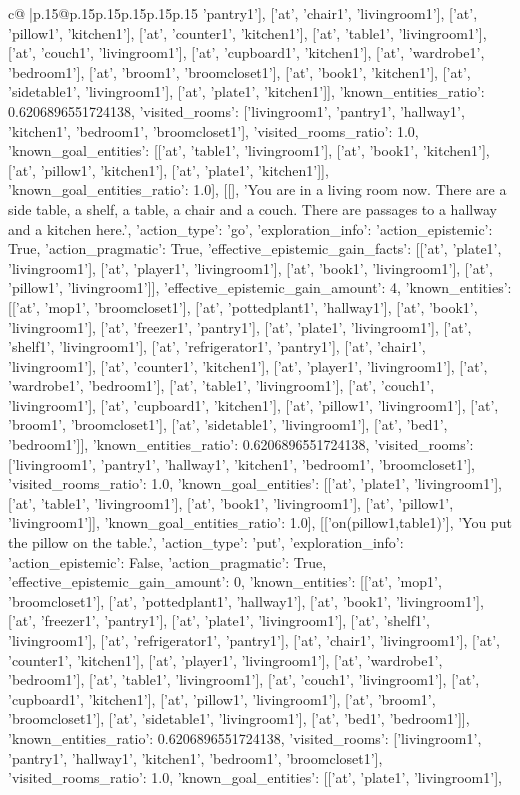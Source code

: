 \documentclass{article}
\begin{document}
{\begin{supertabular}{c@{$\;$}|p{.15\linewidth}@{}p{.15\linewidth}p{.15\linewidth}p{.15\linewidth}p{.15\linewidth}p{.15\linewidth}}
{{{'pantry1'], ['at', 'chair1', 'livingroom1'], ['at', 'pillow1', 'kitchen1'], ['at', 'counter1', 'kitchen1'], ['at', 'table1', 'livingroom1'], ['at', 'couch1', 'livingroom1'], ['at', 'cupboard1', 'kitchen1'], ['at', 'wardrobe1', 'bedroom1'], ['at', 'broom1', 'broomcloset1'], ['at', 'book1', 'kitchen1'], ['at', 'sidetable1', 'livingroom1'], ['at', 'plate1', 'kitchen1']], 'known_entities_ratio': 0.6206896551724138, 'visited_rooms': ['livingroom1', 'pantry1', 'hallway1', 'kitchen1', 'bedroom1', 'broomcloset1'], 'visited_rooms_ratio': 1.0, 'known_goal_entities': [['at', 'table1', 'livingroom1'], ['at', 'book1', 'kitchen1'], ['at', 'pillow1', 'kitchen1'], ['at', 'plate1', 'kitchen1']], 'known_goal_entities_ratio': 1.0}}], [[], 'You are in a living room now. There are a side table, a shelf, a table, a chair and a couch. There are passages to a hallway and a kitchen here.', {'action_type': 'go', 'exploration_info': {'action_epistemic': True, 'action_pragmatic': True, 'effective_epistemic_gain_facts': [['at', 'plate1', 'livingroom1'], ['at', 'player1', 'livingroom1'], ['at', 'book1', 'livingroom1'], ['at', 'pillow1', 'livingroom1']], 'effective_epistemic_gain_amount': 4, 'known_entities': [['at', 'mop1', 'broomcloset1'], ['at', 'pottedplant1', 'hallway1'], ['at', 'book1', 'livingroom1'], ['at', 'freezer1', 'pantry1'], ['at', 'plate1', 'livingroom1'], ['at', 'shelf1', 'livingroom1'], ['at', 'refrigerator1', 'pantry1'], ['at', 'chair1', 'livingroom1'], ['at', 'counter1', 'kitchen1'], ['at', 'player1', 'livingroom1'], ['at', 'wardrobe1', 'bedroom1'], ['at', 'table1', 'livingroom1'], ['at', 'couch1', 'livingroom1'], ['at', 'cupboard1', 'kitchen1'], ['at', 'pillow1', 'livingroom1'], ['at', 'broom1', 'broomcloset1'], ['at', 'sidetable1', 'livingroom1'], ['at', 'bed1', 'bedroom1']], 'known_entities_ratio': 0.6206896551724138, 'visited_rooms': ['livingroom1', 'pantry1', 'hallway1', 'kitchen1', 'bedroom1', 'broomcloset1'], 'visited_rooms_ratio': 1.0, 'known_goal_entities': [['at', 'plate1', 'livingroom1'], ['at', 'table1', 'livingroom1'], ['at', 'book1', 'livingroom1'], ['at', 'pillow1', 'livingroom1']], 'known_goal_entities_ratio': 1.0}}], [['on(pillow1,table1)'], 'You put the pillow on the table.', {'action_type': 'put', 'exploration_info': {'action_epistemic': False, 'action_pragmatic': True, 'effective_epistemic_gain_amount': 0, 'known_entities': [['at', 'mop1', 'broomcloset1'], ['at', 'pottedplant1', 'hallway1'], ['at', 'book1', 'livingroom1'], ['at', 'freezer1', 'pantry1'], ['at', 'plate1', 'livingroom1'], ['at', 'shelf1', 'livingroom1'], ['at', 'refrigerator1', 'pantry1'], ['at', 'chair1', 'livingroom1'], ['at', 'counter1', 'kitchen1'], ['at', 'player1', 'livingroom1'], ['at', 'wardrobe1', 'bedroom1'], ['at', 'table1', 'livingroom1'], ['at', 'couch1', 'livingroom1'], ['at', 'cupboard1', 'kitchen1'], ['at', 'pillow1', 'livingroom1'], ['at', 'broom1', 'broomcloset1'], ['at', 'sidetable1', 'livingroom1'], ['at', 'bed1', 'bedroom1']], 'known_entities_ratio': 0.6206896551724138, 'visited_rooms': ['livingroom1', 'pantry1', 'hallway1', 'kitchen1', 'bedroom1', 'broomcloset1'], 'visited_rooms_ratio': 1.0, 'known_goal_entities': [['at', 'plate1', 'livingroom1'], }}}
\end{supertabular}}
\end{document}

